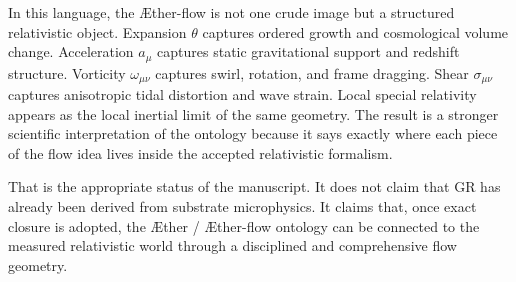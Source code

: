 \documentclass[11pt]{article}
\newcommand{\Aether}{\AE{}ther}
\newcommand{\Aflow}{\AE{}ther-flow}
\begin{document}
In this language, the \Aflow{} is not one crude image but a structured relativistic object. Expansion \(\theta\) captures ordered growth and cosmological volume change. Acceleration \(a_\mu\) captures static gravitational support and redshift structure. Vorticity \(\omega_{\mu\nu}\) captures swirl, rotation, and frame dragging. Shear \(\sigma_{\mu\nu}\) captures anisotropic tidal distortion and wave strain. Local special relativity appears as the local inertial limit of the same geometry. The result is a stronger scientific interpretation of the ontology because it says exactly where each piece of the flow idea lives inside the accepted relativistic formalism.

That is the appropriate status of the manuscript. It does not claim that GR has already been derived from substrate microphysics. It claims that, once exact closure is adopted, the \Aether{} / \Aflow{} ontology can be connected to the measured relativistic world through a disciplined and comprehensive flow geometry.
\end{document}
